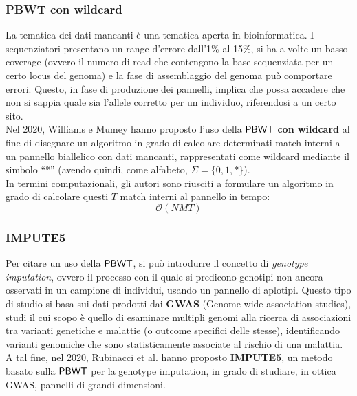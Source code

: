\subsubsection{PBWT con wildcard}
La tematica dei dati mancanti è una tematica aperta in
bioinformatica. I sequenziatori presentano un range d'errore
dall'1\% al 15\%, si ha a volte un basso coverage (ovvero il numero di
read che contengono la base sequenziata per un certo locus del genoma) e la fase
di assemblaggio del genoma può comportare errori. Questo, in fase di produzione
dei pannelli, implica che possa accadere che non si sappia quale sia l'allele
corretto per un individuo, riferendosi a un certo sito. \\
Nel 2020, Williams e Mumey \cite{williams} hanno proposto l'uso della
$\mbox{\rm {\sf PBWT}}$ \textbf{con 
  wildcard} al fine di disegnare un algoritmo in grado di calcolare determinati
match interni a un pannello biallelico con dati mancanti, rappresentati come
wildcard mediante il simbolo ``*'' (avendo quindi, come alfabeto,
$\Sigma=\{0,1,*\}$).\\ 
In termini computazionali, gli autori sono riusciti a formulare un algoritmo in
grado di calcolare questi $T$ match interni al pannello in tempo: 
\begin{equation}
  \label{eq:pbwtwild}
  \mathcal{O}(\mathit{NMT})
\end{equation}
\subsubsection{IMPUTE5}
Per citare un uso della $\mbox{\rm {\sf PBWT}}$, si può introdurre il concetto di
\textit{genotype 
  imputation}, ovvero il processo con il quale si predicono genotipi non ancora
osservati in un campione di individui, usando un pannello di aplotipi. Questo
tipo di studio si basa sui dati prodotti dai \textbf{GWAS} (Genome-wide
    association studies), studi il cui scopo è quello di esaminare multipli
genomi alla ricerca di associazioni tra varianti genetiche e malattie (o
outcome specifici delle stesse), identificando varianti genomiche che sono
statisticamente associate al rischio di una malattia.\\ 
A tal fine, nel 2020, Rubinacci et al. \cite{impute5} hanno proposto
\textbf{IMPUTE5}, un metodo basato sulla $\mbox{\rm {\sf PBWT}}$ per la genotype 
  imputation, in grado di studiare, in ottica GWAS, pannelli di grandi
  dimensioni. 
